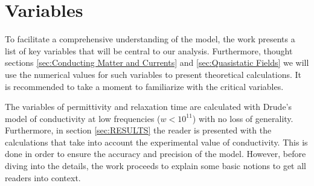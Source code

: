 \section{Variables}
To facilitate a comprehensive understanding of the model, the work presents a list of key variables that will be central to our analysis. Furthermore, thought sections \ref{sec:Conducting Matter and Currents} and \ref{sec:Quasistatic Fields} we will use the numerical values for such variables to present theoretical calculations. It is recommended to take a moment to familiarize with the critical variables. 
\\
\begin{table}[H]
\caption{Critical Variables. This table presents key parameters related to copper conductors used in the study. The units specified for each parameter are shown in square brackets. }
\end{table}

The variables of permittivity and relaxation time are calculated with Drude's model of conductivity at low frequencies ($w < 10^{11}$) with no loss of generality. Furthermore, in section \ref{sec:RESULTS} the reader is presented with the calculations that take into account the experimental value of conductivity. This is done in order to ensure the accuracy and precision of the model. However, before diving into the details, the work proceeds to explain some basic notions to get all readers into context.
\\


